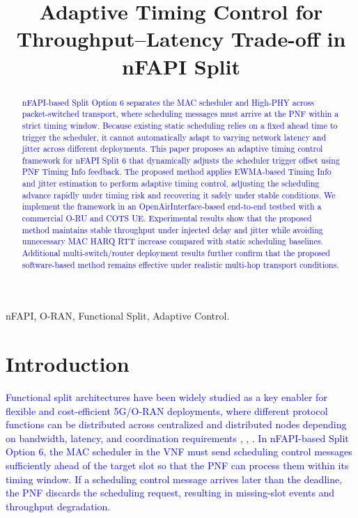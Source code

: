 \documentclass[10pt, conference, letterpaper]{IEEEtran}
\begin{document}
\title{Adaptive Timing Control for Throughput–Latency Trade-off in nFAPI Split}
\author{
}

\maketitle

\begin{abstract}
\textcolor{blue}{nFAPI-based Split Option 6 separates the MAC scheduler and High-PHY across packet-switched transport, where scheduling messages must arrive at the PNF within a strict timing window. Because existing static scheduling relies on a fixed ahead time to trigger the scheduler, it cannot automatically adapt to varying network latency and jitter across different deployments. This paper proposes an adaptive timing control framework for nFAPI Split 6 that dynamically adjusts the scheduler trigger offset using PNF Timing Info feedback. The proposed method applies EWMA-based Timing Info and jitter estimation to perform adaptive timing control, adjusting the scheduling advance rapidly under timing risk and recovering it safely under stable conditions. We implement the framework in an OpenAirInterface-based end-to-end testbed with a commercial O-RU and COTS UE. Experimental results show that the proposed method maintains stable throughput under injected delay and jitter while avoiding unnecessary MAC HARQ RTT increase compared with static scheduling baselines. Additional multi-switch/router deployment results further confirm that the proposed software-based method remains effective under realistic multi-hop transport conditions.}
\end{abstract}

\begin{IEEEkeywords}
nFAPI, O-RAN, Functional Split, Adaptive Control.
\end{IEEEkeywords}

\section{Introduction}

\textcolor{blue}{Functional split architectures have been widely studied as a key enabler for flexible and cost-efficient 5G/O-RAN deployments, where different protocol functions can be distributed across centralized and distributed nodes depending on bandwidth, latency, and coordination requirements \cite{Larsen2019}, \cite{3GPP_TR_38_801}, \cite{11124199}. In nFAPI-based Split Option 6, the MAC scheduler in the VNF must send scheduling control messages sufficiently ahead of the target slot so that the PNF can process them within its timing window. If a scheduling control message arrives later than the deadline, the PNF discards the scheduling request, resulting in missing-slot events and throughput degradation.}
\end{document}
